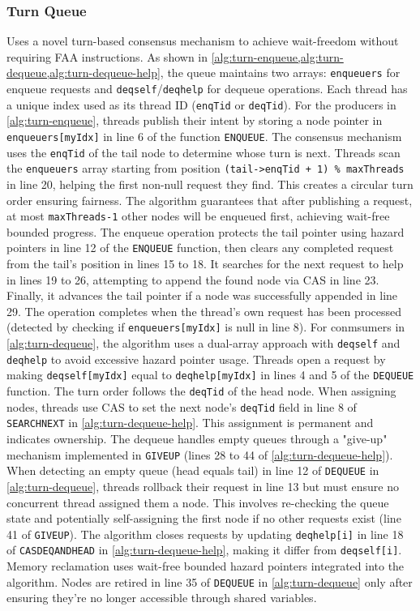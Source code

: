 \subsubsection{Turn Queue} 
Uses a novel turn-based consensus mechanism to achieve wait-freedom without requiring \ac{FAA} instructions. As shown in \cref{alg:turn-enqueue,alg:turn-dequeue,alg:turn-dequeue-help}, the queue maintains two arrays: \texttt{enqueuers} for enqueue requests and \texttt{deqself}/\texttt{deqhelp} for dequeue operations. Each thread has a unique index used as its thread ID (\texttt{enqTid} or \texttt{deqTid}). For the producers in \cref{alg:turn-enqueue}, threads publish their intent by storing a node pointer in \texttt{enqueuers[myIdx]} in line 6 of the function \texttt{ENQUEUE}. The consensus mechanism uses the \texttt{enqTid} of the tail node to determine whose turn is next. Threads scan the \texttt{enqueuers} array starting from position \texttt{(tail->enqTid + 1) \% maxThreads} in line 20, helping the first non-null request they find. This creates a circular turn order ensuring fairness. The algorithm guarantees that after publishing a request, at most \texttt{maxThreads-1} other nodes will be enqueued first, achieving wait-free bounded progress. The enqueue operation protects the tail pointer using hazard pointers in line 12 of the \texttt{ENQUEUE} function, then clears any completed request from the tail's position in lines 15 to 18. It searches for the next request to help in lines 19 to 26, attempting to append the found node via \ac{CAS} in line 23. Finally, it advances the tail pointer if a node was successfully appended in line 29. The operation completes when the thread's own request has been processed (detected by checking if \texttt{enqueuers[myIdx]} is null in line 8). For conmsumers in \cref{alg:turn-dequeue}, the algorithm uses a dual-array approach with \texttt{deqself} and \texttt{deqhelp} to avoid excessive hazard pointer usage. Threads open a request by making \texttt{deqself[myIdx]} equal to \texttt{deqhelp[myIdx]} in lines 4 and 5 of the \texttt{DEQUEUE} function. The turn order follows the \texttt{deqTid} of the head node. When assigning nodes, threads use \ac{CAS} to set the next node's \texttt{deqTid} field in line 8 of \texttt{SEARCHNEXT} in \cref{alg:turn-dequeue-help}. This assignment is permanent and indicates ownership. The dequeue handles empty queues through a "give-up" mechanism implemented in \texttt{GIVEUP} (lines 28 to 44 of \cref{alg:turn-dequeue-help}). When detecting an empty queue (head equals tail) in line 12 of \texttt{DEQUEUE} in \cref{alg:turn-dequeue}, threads rollback their request in line 13 but must ensure no concurrent thread assigned them a node. This involves re-checking the queue state and potentially self-assigning the first node if no other requests exist (line 41 of \texttt{GIVEUP}). The algorithm closes requests by updating \texttt{deqhelp[i]} in line 18 of \texttt{CASDEQANDHEAD} in \cref{alg:turn-dequeue-help}, making it differ from \texttt{deqself[i]}. Memory reclamation uses wait-free bounded hazard pointers integrated into the algorithm. Nodes are retired in line 35 of \texttt{DEQUEUE} in \cref{alg:turn-dequeue} only after ensuring they're no longer accessible through shared variables. 